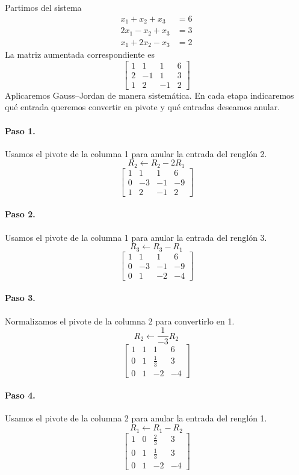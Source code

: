\documentclass[12pt]{article}
\theoremstyle{remark}
\begin{document}
Partimos del sistema
\[
\begin{aligned}
x_{1} + x_{2} + x_{3} &= 6\\
2 x_{1} - x_{2} + x_{3} &= 3\\
x_{1} + 2 x_{2} - x_{3} &= 2
\end{aligned}
\]
La matriz aumentada correspondiente es
\[
\left[\begin{array}{ccc|c}
1 & 1 & 1 & 6\\
2 & -1 & 1 & 3\\
1 & 2 & -1 & 2
\end{array}\right]
\]
Aplicaremos Gauss--Jordan de manera sistemática. En cada etapa indicaremos qué entrada queremos convertir en pivote y qué entradas deseamos anular.
\paragraph{Paso 1.} Usamos el pivote de la columna 1 para anular la entrada del renglón 2.
\[
R_{2}\leftarrow R_{2}-2R_{1}
\]
\[
\left[\begin{array}{ccc|c}
1 & 1 & 1 & 6\\
0 & -3 & -1 & -9\\
1 & 2 & -1 & 2
\end{array}\right]
\]
\paragraph{Paso 2.} Usamos el pivote de la columna 1 para anular la entrada del renglón 3.
\[
R_{3}\leftarrow R_{3}-R_{1}
\]
\[
\left[\begin{array}{ccc|c}
1 & 1 & 1 & 6\\
0 & -3 & -1 & -9\\
0 & 1 & -2 & -4
\end{array}\right]
\]
\paragraph{Paso 3.} Normalizamos el pivote de la columna 2 para convertirlo en 1.
\[
R_{2}\leftarrow \frac{1}{-3}R_{2}
\]
\[
\left[\begin{array}{ccc|c}
1 & 1 & 1 & 6\\
0 & 1 & \frac{1}{3} & 3\\
0 & 1 & -2 & -4
\end{array}\right]
\]
\paragraph{Paso 4.} Usamos el pivote de la columna 2 para anular la entrada del renglón 1.
\[
R_{1}\leftarrow R_{1}-R_{2}
\]
\[
\left[\begin{array}{ccc|c}
1 & 0 & \frac{2}{3} & 3\\
0 & 1 & \frac{1}{3} & 3\\
0 & 1 & -2 & -4
\end{array}\right]
\]
\end{document}
